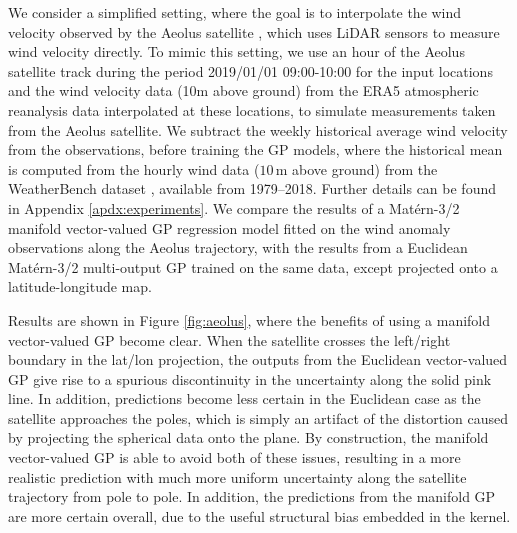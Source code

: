 We consider a simplified setting, where the goal is to interpolate the wind velocity observed by the Aeolus satellite \cite{reitebuch2012spaceborne}, which uses LiDAR sensors to measure wind velocity directly.
To mimic this setting, we use an hour of the Aeolus satellite track during the period 2019/01/01 09:00-10:00 for the input locations and the wind velocity data (10m above ground) from the ERA5 atmospheric reanalysis data \cite{hersbach2016era5} interpolated at these locations, to simulate measurements taken from the Aeolus satellite.
We subtract the weekly historical average wind velocity from the observations, before training the GP models, where the historical mean is computed from the hourly wind data ($10$\,m above ground) from the WeatherBench dataset \cite{rasp2020weatherbench}, available from 1979--2018.
Further details can be found in Appendix \ref{apdx:experiments}.
We compare the results of a Mat\'ern-3/2 manifold vector-valued GP regression model fitted on the wind anomaly observations along the Aeolus trajectory, with the results from a Euclidean Mat\'ern-3/2 multi-output GP trained on the same data, except projected onto a latitude-longitude map.

Results are shown in Figure \ref{fig:aeolus}, where the benefits of using a manifold vector-valued GP become clear.
When the satellite crosses the left/right boundary in the lat/lon projection, the outputs from the Euclidean vector-valued GP give rise to a spurious discontinuity in the uncertainty along the solid pink line.
In addition, predictions become less certain in the Euclidean case as the satellite approaches the poles, which is simply an artifact of the distortion caused by projecting the spherical data onto the plane.
By construction, the manifold vector-valued GP is able to avoid both of these issues, resulting in a more realistic prediction with much more uniform uncertainty along the satellite trajectory from pole to pole.
In addition, the predictions from the manifold GP are more certain overall, due to the useful structural bias embedded in the kernel.

